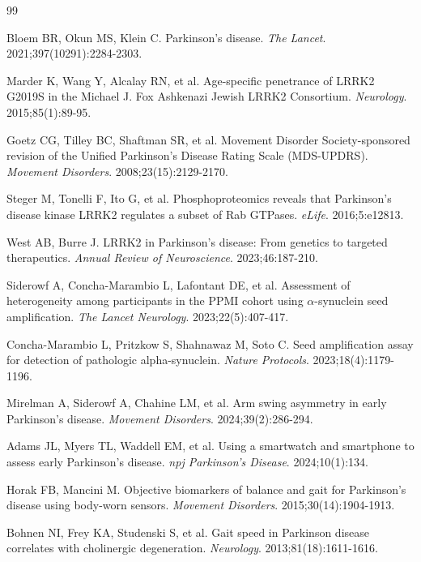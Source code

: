 \documentclass[11pt]{article}
\begin{document}
\begin{thebibliography}{99}

Bloem BR, Okun MS, Klein C. Parkinson's disease. \textit{The Lancet}. 2021;397(10291):2284-2303.

Marder K, Wang Y, Alcalay RN, et al. Age-specific penetrance of LRRK2 G2019S in the Michael J. Fox Ashkenazi Jewish LRRK2 Consortium. \textit{Neurology}. 2015;85(1):89-95.

Goetz CG, Tilley BC, Shaftman SR, et al. Movement Disorder Society-sponsored revision of the Unified Parkinson's Disease Rating Scale (MDS-UPDRS). \textit{Movement Disorders}. 2008;23(15):2129-2170.

Steger M, Tonelli F, Ito G, et al. Phosphoproteomics reveals that Parkinson's disease kinase LRRK2 regulates a subset of Rab GTPases. \textit{eLife}. 2016;5:e12813.

West AB, Burre J. LRRK2 in Parkinson's disease: From genetics to targeted therapeutics. \textit{Annual Review of Neuroscience}. 2023;46:187-210.

Siderowf A, Concha-Marambio L, Lafontant DE, et al. Assessment of heterogeneity among participants in the PPMI cohort using $\alpha$-synuclein seed amplification. \textit{The Lancet Neurology}. 2023;22(5):407-417.

Concha-Marambio L, Pritzkow S, Shahnawaz M, Soto C. Seed amplification assay for detection of pathologic alpha-synuclein. \textit{Nature Protocols}. 2023;18(4):1179-1196.

Mirelman A, Siderowf A, Chahine LM, et al. Arm swing asymmetry in early Parkinson's disease. \textit{Movement Disorders}. 2024;39(2):286-294.

Adams JL, Myers TL, Waddell EM, et al. Using a smartwatch and smartphone to assess early Parkinson's disease. \textit{npj Parkinson's Disease}. 2024;10(1):134.

Horak FB, Mancini M. Objective biomarkers of balance and gait for Parkinson's disease using body-worn sensors. \textit{Movement Disorders}. 2015;30(14):1904-1913.

Bohnen NI, Frey KA, Studenski S, et al. Gait speed in Parkinson disease correlates with cholinergic degeneration. \textit{Neurology}. 2013;81(18):1611-1616.


\end{thebibliography}
\end{document}
